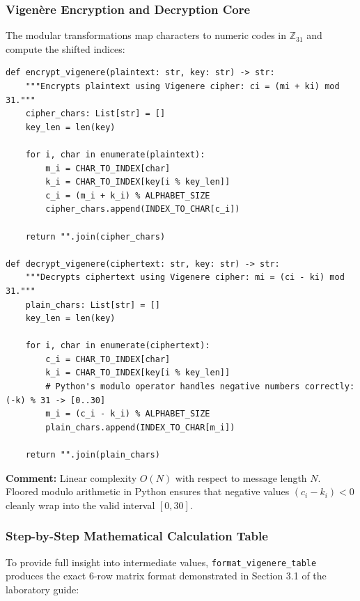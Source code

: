 \documentclass{labreport}
\begin{document}
\subsubsection{Vigenère Encryption and Decryption Core}
The modular transformations map characters to numeric codes in $\mathbb{Z}_{31}$ and compute the shifted indices:

\begin{lstlisting}[style=python]
def encrypt_vigenere(plaintext: str, key: str) -> str:
    """Encrypts plaintext using Vigenere cipher: ci = (mi + ki) mod 31."""
    cipher_chars: List[str] = []
    key_len = len(key)

    for i, char in enumerate(plaintext):
        m_i = CHAR_TO_INDEX[char]
        k_i = CHAR_TO_INDEX[key[i % key_len]]
        c_i = (m_i + k_i) % ALPHABET_SIZE
        cipher_chars.append(INDEX_TO_CHAR[c_i])

    return "".join(cipher_chars)

def decrypt_vigenere(ciphertext: str, key: str) -> str:
    """Decrypts ciphertext using Vigenere cipher: mi = (ci - ki) mod 31."""
    plain_chars: List[str] = []
    key_len = len(key)

    for i, char in enumerate(ciphertext):
        c_i = CHAR_TO_INDEX[char]
        k_i = CHAR_TO_INDEX[key[i % key_len]]
        # Python's modulo operator handles negative numbers correctly: (-k) % 31 -> [0..30]
        m_i = (c_i - k_i) % ALPHABET_SIZE
        plain_chars.append(INDEX_TO_CHAR[m_i])

    return "".join(plain_chars)
\end{lstlisting}
\textbf{Comment:} Linear complexity $O(N)$ with respect to message length $N$. Floored modulo arithmetic in Python ensures that negative values $(c_i - k_i) < 0$ cleanly wrap into the valid interval $[0, 30]$.

\subsubsection{Step-by-Step Mathematical Calculation Table}
To provide full insight into intermediate values, \texttt{format\_vigenere\_table} produces the exact 6-row matrix format demonstrated in Section 3.1 of the laboratory guide:
\end{document}
